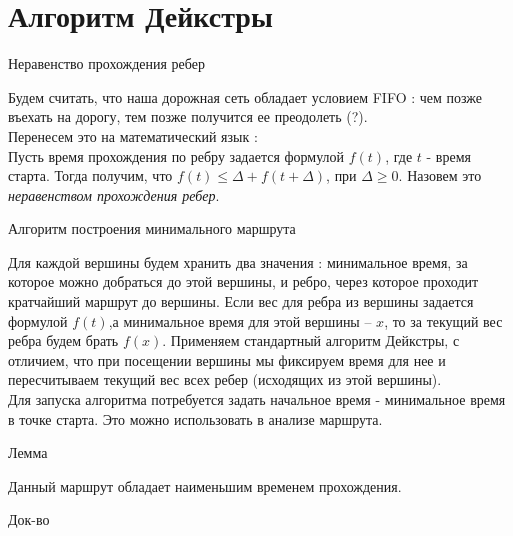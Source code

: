 \documentclass[12pt, a4paper]{article}
\begin{document}
\newpage
\section*{Алгоритм Дейкстры}

$\textbf{Неравенство прохождения ребер}$

Будем считать, что наша дорожная сеть обладает условием FIFO : чем позже въехать на дорогу, тем позже получится ее преодолеть (?).\\
Перенесем это на математический язык : \\
Пусть время прохождения по ребру задается формулой $f(t)$, где $t$ - время старта. Тогда получим, что $f(t) \le \Delta + f(t + \Delta)$, при $\Delta \ge 0$. Назовем это \textit{неравенством прохождения ребер}.


$\textbf{Алгоритм построения минимального маршрута}$

Для каждой вершины будем хранить два значения : минимальное время, за которое можно добраться до этой вершины, и ребро, через которое проходит кратчайший маршрут до вершины.
Если вес для ребра из вершины задается формулой $f(t)$,а минимальное время для этой вершины -- $x$, то за текущий вес ребра будем брать $f(x)$.
Применяем стандартный алгоритм Дейкстры, с отличием, что при посещении вершины мы фиксируем время для нее и пересчитываем текущий вес всех ребер (исходящих из этой вершины).\\
Для запуска алгоритма потребуется задать начальное время - минимальное время в точке старта. Это можно использовать в анализе маршрута.

$\textbf{Лемма}$

Данный маршрут обладает наименьшим временем прохождения.

$\textit{Док-во}$
\end{document}
